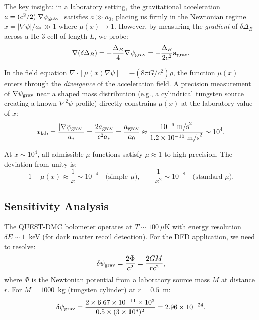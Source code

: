 \documentclass[11pt]{article}
\theoremstyle{definition}
\theoremstyle{remark}
\newcommand{\ee}[1]{\times 10^{#1}}
\begin{document}
The key insight: in a laboratory setting, the gravitational acceleration
$a = (c^2/2)|\nabla\psi_{\rm grav}|$ satisfies $a \gg a_0$, placing us
firmly in the Newtonian regime $x = |\nabla\psi|/a_* \gg 1$ where
$\mu(x) \to 1$. However, by measuring the \textit{gradient} of
$\delta\Delta_B$ across a He-3 cell of length $L$, we probe:
\begin{equation}
\nabla(\delta\Delta_B) = -\frac{\Delta_B}{4}\nabla\psi_{\rm grav}
= -\frac{\Delta_B}{2c^2}\mathbf{a}_{\rm grav}.
\label{eq:gradient_probe}
\end{equation}

In the field equation $\nabla\cdot[\mu(x)\nabla\psi] = -(8\pi G/c^2)\rho$,
the function $\mu(x)$ enters through the \textit{divergence} of the
acceleration field. A precision measurement of $\nabla\psi_{\rm grav}$
near a shaped mass distribution (e.g., a cylindrical tungsten source
creating a known $\nabla^2\psi$ profile) directly constrains $\mu(x)$
at the laboratory value of $x$:
\begin{equation}
x_{\rm lab} = \frac{|\nabla\psi_{\rm grav}|}{a_*}
= \frac{2a_{\rm grav}}{c^2 a_*}
= \frac{a_{\rm grav}}{a_0}
\approx \frac{10^{-6}~\text{m/s}^2}{1.2\ee{-10}~\text{m/s}^2}
\sim 10^4.
\label{eq:x_lab}
\end{equation}

At $x \sim 10^4$, all admissible $\mu$-functions satisfy $\mu \approx 1$
to high precision. The deviation from unity is:
\begin{equation}
1 - \mu(x) \approx \frac{1}{x} \sim 10^{-4} \quad \text{(simple-}\mu\text{)},
\qquad
\frac{1}{x^2} \sim 10^{-8} \quad \text{(standard-}\mu\text{)}.
\label{eq:mu_deviation}
\end{equation}

\subsection{Sensitivity Analysis}

The QUEST-DMC bolometer operates at $T \sim 100~\mu$K with energy
resolution $\delta E \sim 1$~keV (for dark matter recoil detection).
For the DFD application, we need to resolve:
\begin{equation}
\delta\psi_{\rm grav} = \frac{2\Phi}{c^2} = \frac{2GM}{rc^2},
\label{eq:psi_grav_source}
\end{equation}
where $\Phi$ is the Newtonian potential from a laboratory source mass $M$
at distance $r$. For $M = 1000$~kg (tungsten cylinder) at $r = 0.5$~m:
\begin{equation}
\delta\psi_{\rm grav} = \frac{2 \times 6.67\ee{-11} \times 10^3}
{0.5 \times (3\ee{8})^2}
= 2.96\ee{-24}.
\label{eq:psi_numerical}
\end{equation}
\end{document}
